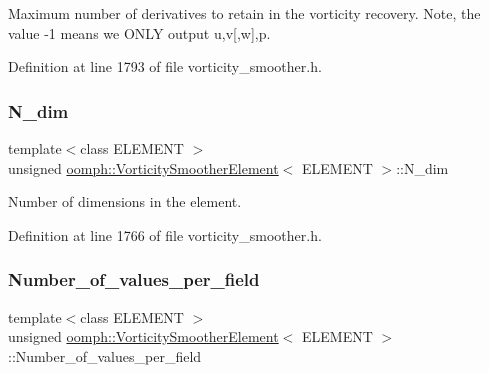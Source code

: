 Maximum number of derivatives to retain in the vorticity recovery. Note, the value -\/1 means we O\+N\+LY output u,v\mbox{[},w\mbox{]},p. 



Definition at line 1793 of file vorticity\+\_\+smoother.\+h.

\mbox{\label{classoomph_1_1VorticitySmootherElement_afc0f746d35e11a455fe36df7be1069ec}} 
\subsubsection{\texorpdfstring{N\+\_\+dim}{N\_dim}}
{\footnotesize\ttfamily template$<$class E\+L\+E\+M\+E\+NT $>$ \\
unsigned \hyperlink{classoomph_1_1VorticitySmootherElement}{oomph\+::\+Vorticity\+Smoother\+Element}$<$ E\+L\+E\+M\+E\+NT $>$\+::N\+\_\+dim\hspace{0.3cm}{\ttfamily [private]}}



Number of dimensions in the element. 



Definition at line 1766 of file vorticity\+\_\+smoother.\+h.

\mbox{\label{classoomph_1_1VorticitySmootherElement_ab25f6ce614cbcca04d1dc8e72baf80e6}} 
\subsubsection{\texorpdfstring{Number\+\_\+of\+\_\+values\+\_\+per\+\_\+field}{Number\_of\_values\_per\_field}}
{\footnotesize\ttfamily template$<$class E\+L\+E\+M\+E\+NT $>$ \\
unsigned \hyperlink{classoomph_1_1VorticitySmootherElement}{oomph\+::\+Vorticity\+Smoother\+Element}$<$ E\+L\+E\+M\+E\+NT $>$\+::Number\+\_\+of\+\_\+values\+\_\+per\+\_\+field\hspace{0.3cm}{\ttfamily [private]}}



